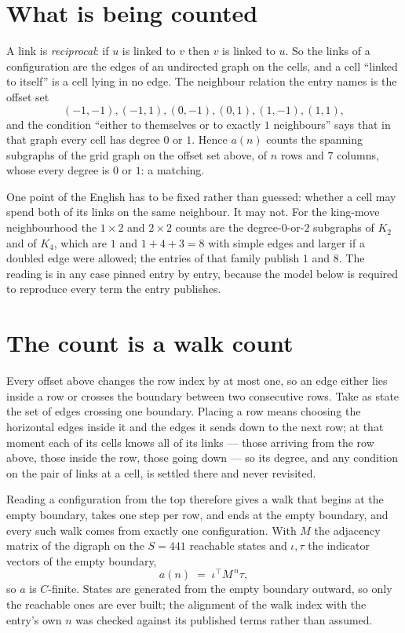 \documentclass[11pt,a4paper]{article}
\theoremstyle{plain}
\theoremstyle{definition}
\begin{document}
\section{What is being counted}

A link is \emph{reciprocal}: if $u$ is linked to $v$ then $v$ is linked to $u$. So the links
of a configuration are the edges of an undirected graph on the cells, and a cell ``linked to
itself'' is a cell lying in no edge. The neighbour relation the entry names is the offset set
\[
(-1,-1), (-1,1), (0,-1), (0,1), (1,-1), (1,1),
\]
and the condition ``either to themselves or to exactly $1$ neighbours'' says that in that
graph every cell has degree $0$ or $1$. Hence $a(n)$ counts the spanning subgraphs of the
grid graph on the offset set above, of $n$ rows and $7$ columns,
whose every degree is $0$ or $1$: a matching.

One point of the English has to be fixed rather than guessed: whether a cell may spend both of
its links on the same neighbour. It may not. For the king-move neighbourhood the $1\times2$
and $2\times2$ counts are the degree-$0$-or-$2$ subgraphs of $K_2$ and of $K_4$, which are $1$
and $1+4+3=8$ with simple edges and larger if a doubled edge were allowed; the entries of that
family publish $1$ and $8$. The reading is in any case pinned entry by entry, because the
model below is required to reproduce every term the entry publishes.


\section{The count is a walk count}

Every offset above changes the row index by at most one, so an edge either lies inside a row
or crosses the boundary between two consecutive rows. Take as state the set of edges crossing
one boundary. Placing a row means choosing the horizontal edges inside it and the edges it
sends down to the next row; at that moment each of its cells knows all of its links --- those
arriving from the row above, those inside the row, those going down --- so its degree, and any
condition on the pair of links at a cell, is settled there and never revisited.

Reading a configuration from the top therefore gives a walk that begins at the empty boundary,
takes one step per row, and ends at the empty boundary, and every such walk comes from exactly
one configuration. With $M$ the adjacency matrix of the digraph on the $S=441$ reachable
states and $\iota,\tau$ the indicator vectors of the empty boundary,
\[
a(n)\;=\;\iota^{\!\top}M^{\,n}\tau ,
\]
so $a$ is $C$-finite. States are generated from the empty boundary outward, so only the
reachable ones are ever built; the alignment of the walk index with the entry's own $n$ was
checked against its published terms rather than assumed.
\end{document}
